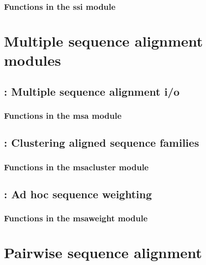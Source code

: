\documentclass[10pt]{book}
\begin{document}
\subsection{Functions in the ssi module}




\chapter{Multiple sequence alignment modules}

\newpage
\section{: Multiple sequence alignment i/o}

\subsection{Functions in the msa module}


\newpage
\section{: Clustering aligned sequence families}

\subsection{Functions in the msacluster module}


\newpage
\section{: Ad hoc sequence weighting}

\subsection{Functions in the msaweight module}



\chapter{Pairwise sequence alignment}
\end{document}
